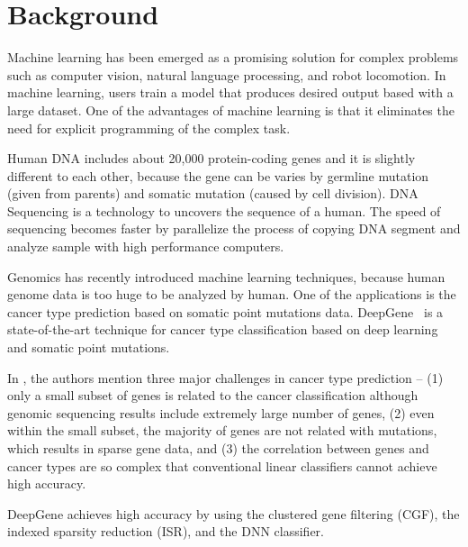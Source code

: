 \section{Background}

Machine learning has been emerged as a promising solution for complex problems such as computer vision, natural language processing, and robot locomotion. In machine learning, users train a model that produces desired output based with a large dataset. One of the advantages of machine learning is that it eliminates the need for explicit programming of the complex task.

Human DNA includes about 20,000 protein-coding genes \cite{ezkurdia2014multiple} and it is slightly different to each other, because the gene can be varies by germline mutation (given from parents) and somatic mutation (caused by cell division). DNA Sequencing \cite{sanger1977dna,anderson1981shotgun,ansorge2009next} is a technology to uncovers the sequence of a human. The speed of sequencing becomes faster by parallelize the process of copying DNA segment and analyze sample with high performance computers.

Genomics has recently introduced machine learning techniques, because human genome data is too huge to be analyzed by human. One of the applications is the cancer type prediction based on somatic point mutations data. DeepGene~\cite{yuan2016deepgene} is a state-of-the-art technique for cancer type classification based on deep learning and somatic point mutations.

In \cite{yuan2016deepgene}, the authors mention three major challenges in cancer type prediction -- (1) only a small subset of genes is related to the cancer classification although genomic sequencing results include extremely large number of genes, (2) even within the small subset, the majority of genes are not related with mutations, which results in sparse gene data, and (3) the correlation between genes and cancer types are so complex that conventional linear classifiers cannot achieve high accuracy. 

DeepGene achieves high accuracy by using the clustered gene filtering (CGF), the indexed sparsity reduction (ISR), and the DNN classifier.
